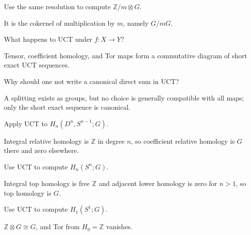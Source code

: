 \begin{problem}\label{prob:viii26-10}
Use the same resolution to compute \(\mathbb Z/m\otimes G\).
\end{problem}
\begin{solution}
It is the cokernel of multiplication by \(m\), namely \(G/mG\).
\end{solution}

\begin{problem}\label{prob:viii26-11}
What happens to UCT under \(f:X\to Y\)?
\end{problem}
\begin{solution}
Tensor, coefficient homology, and Tor maps form a commutative diagram of short exact UCT sequences.
\end{solution}

\begin{problem}\label{prob:viii26-12}
Why should one not write a canonical direct sum in UCT?
\end{problem}
\begin{solution}
A splitting exists as groups, but no choice is generally compatible with all maps; only the short exact sequence is canonical.
\end{solution}

\begin{problem}\label{prob:viii26-13}
Apply UCT to \(H_n(D^n,S^{n-1};G)\).
\end{problem}
\begin{solution}
Integral relative homology is \(\mathbb Z\) in degree \(n\), so coefficient relative homology is \(G\) there and zero elsewhere.
\end{solution}

\begin{problem}[Sphere]\label{prob:viii26-14}
Use UCT to compute \(H_n(S^n;G)\).
\end{problem}
\begin{solution}
Integral top homology is free \(\mathbb Z\) and adjacent lower homology is zero for \(n>1\), so top homology is \(G\).
\end{solution}

\begin{problem}[Circle]\label{prob:viii26-15}
Use UCT to compute \(H_1(S^1;G)\).
\end{problem}
\begin{solution}
\(\mathbb Z\otimes G\cong G\), and Tor from \(H_0=\mathbb Z\) vanishes.
\end{solution}

